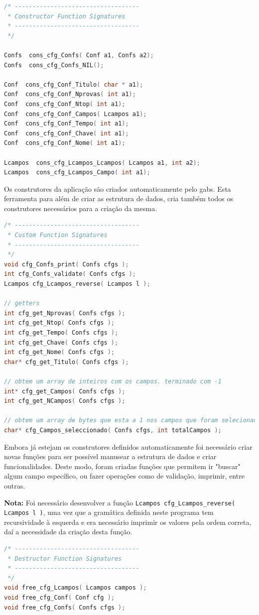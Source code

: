 \documentclass[11pt, a4paper, oneside]{article}
\begin{document}
\begin{lstlisting}[language=C, caption={Construtores do ficheiro de configuração.}]
/* -----------------------------------
 * Constructor Function Signatures
 * -----------------------------------
 */

Confs  cons_cfg_Confs( Conf a1, Confs a2);
Confs  cons_cfg_Confs_NIL();

Conf  cons_cfg_Conf_Titulo( char * a1);
Conf  cons_cfg_Conf_Nprovas( int a1);
Conf  cons_cfg_Conf_Ntop( int a1);
Conf  cons_cfg_Conf_Campos( Lcampos a1);
Conf  cons_cfg_Conf_Tempo( int a1);
Conf  cons_cfg_Conf_Chave( int a1);
Conf  cons_cfg_Conf_Nome( int a1);

Lcampos  cons_cfg_Lcampos_Lcampos( Lcampos a1, int a2);
Lcampos  cons_cfg_Lcampos_Campo( int a1);
\end{lstlisting} 

Os construtores da aplicação são criados automaticamente pelo \textsf{gabs}. Esta ferramenta para além de criar as estrutura de dados, cria também todos os construtores necessários para a criação da mesma.

\begin{lstlisting}[language=C, caption={Funções do ficheiro de configuração.}]
/* -----------------------------------
 * Custom Function Signatures
 * -----------------------------------
 */
void cfg_Confs_print( Confs cfgs );
int cfg_Confs_validate( Confs cfgs );
Lcampos cfg_Lcampos_reverse( Lcampos l );

// getters
int cfg_get_Nprovas( Confs cfgs );
int cfg_get_Ntop( Confs cfgs );
int cfg_get_Tempo( Confs cfgs );
int cfg_get_Chave( Confs cfgs );
int cfg_get_Nome( Confs cfgs );
char* cfg_get_Titulo( Confs cfgs );

// obtem um array de inteiros com os campos. terminado com -1
int* cfg_get_Campos( Confs cfgs );
int cfg_get_NCampos( Confs cfgs );

// obtem um array de bytes que esta a 1 nos campos que foram selecionados
char* cfg_Campos_seleccionado( Confs cfgs, int totalCampos );
\end{lstlisting} 

Embora já estejam os construtores definidos automaticamente foi necessário criar novas funções para ser possível manusear a estrutura de dados e criar funcionalidades. Deste modo, foram criadas funções que permitem ir "buscar" algum campo específico, ou fazer operações como de validação, imprimir, entre outras.

\textbf{Nota:} Foi necessário desenvolver a função \texttt{Lcampos cfg\_Lcampos\_reverse( Lcampos l )}, uma vez que a gramática definida neste programa tem recursividade à esquerda e era necessário imprimir os valores pela ordem correta, daí a necessidade da criação desta função.
\newpage
\begin{lstlisting}[language=C, caption={Funções de libertação de memória.}]
/* -----------------------------------
 * Destructor Function Signatures
 * -----------------------------------
 */
void free_cfg_Lcampos( Lcampos campos );
void free_cfg_Conf( Conf cfg );
void free_cfg_Confs( Confs cfgs );
\end{lstlisting} 
\end{document}
